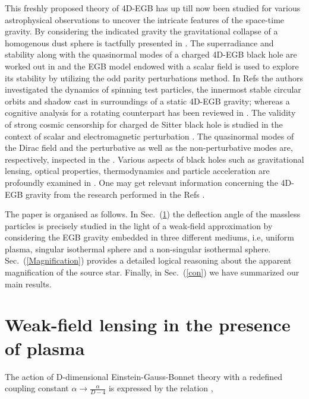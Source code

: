 \documentclass[final,5p,times,twocolumn,unknownkeysallowed]{elsarticle}
\begin{document}
This freshly proposed theory of 4D-EGB has up till now been studied for various astrophysical observations to uncover the intricate features of the space-time gravity. By considering the indicated gravity the gravitational collapse of a homogenous dust sphere is tactfully presented in \cite{Daniel:2020a}.  The
superradiance and stability along with the quasinormal modes of a charged 4D-EGB black hole are worked out in \cite{Zhang:2020a} and the EGB model endowed
with a scalar field \cite{Gilb:2019a} is used to explore its stability by utilizing the odd parity perturbations method.
In Refs \cite{Yupeng:2020a,Ming:2020a} the authors investigated the dynamics of spinning test particles, the innermost stable
circular orbits and shadow cast in surroundings of a static 4D-EGB gravity; whereas a cognitive analysis for a rotating
counterpart has been reviewed in \cite{Rahul:2020a}. The validity of strong cosmic censorship for charged de Sitter black hole is studied in the context
of scalar and electromagnetic perturbation \cite{Akash:2020a}. The quasinormal modes of the Dirac field and the perturbative as well as the non-perturbative
 modes are, respectively, inspected in the \cite{Churi:2020a,Almen:2020a}. Various aspects of black holes such as gravitational lensing,
 optical properties, thermodynamics and particle acceleration are profoundly examined in \cite{Islam:2020a,Abu:2015d,Hedge:2020a,
 Mansr:2020a,Kumara:2020a}. One may get relevant information concerning the 4D-EGB gravity from the research performed in
 the Refs \cite{Li:2020a,Wei:2020b,Dhrm:2020a,Wei:2020c,Moha:2020a,Met:2020a,Robie:2020a,Juli:2020a,Tian:2020a,Jame:2020a,
Yipng:2020a,Tsut:2020a,Fern:2020a,Abu:2020f,Shay:2020a,Maha:2020a,Feng:2021a,Olivera:2009a}.

The paper is organised as follows. In Sec.~(\ref{metric}) the deflection angle of the massless particles is precisely studied
in the light of a weak-field approximation by considering the EGB gravity embedded in three different
mediums, i.e, uniform plasma, singular isothermal sphere and a non-singular isothermal sphere.
Sec.~(\ref{Magnification}) provides a detailed logical reasoning about the apparent magnification of the source star.
Finally, in Sec.~(\ref{con}) we have summarized our main results.


\section{Weak-field lensing in the presence of plasma}\label{metric}
The action of D-dimensional Einstein-Gauss-Bonnet theory with a redefined coupling constant $\alpha\rightarrow\frac{\alpha}{D-4}$ is expressed
by the relation \cite{Glav:2020a,Zhang:2020a},
\end{document}
